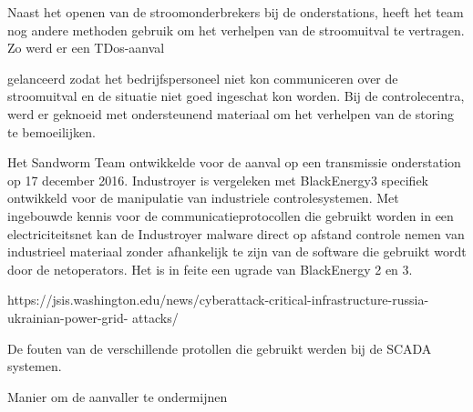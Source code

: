 {Naast het openen van de stroomonderbrekers bij de onderstations, heeft het team nog andere
methoden gebruik om het verhelpen van de stroomuitval te vertragen. Zo werd er een TDos-aanval

gelanceerd zodat het bedrijfspersoneel niet kon communiceren over de stroomuitval en de situatie
niet goed ingeschat kon worden. Bij de controlecentra, werd er geknoeid met ondersteunend
materiaal om het verhelpen van de storing te bemoeilijken.

Het Sandworm Team ontwikkelde voor de aanval op een transmissie onderstation op 17 december
2016. Industroyer is vergeleken met BlackEnergy3 specifiek ontwikkeld voor de manipulatie van
industriele controlesystemen. Met ingebouwde kennis voor de communicatieprotocollen die
gebruikt worden in een electriciteitsnet kan de Industroyer malware direct op afstand controle
nemen van industrieel materiaal zonder afhankelijk te zijn van de software die gebruikt wordt door
de netoperators. Het is in feite een ugrade van BlackEnergy 2 en 3.

https://jsis.washington.edu/news/cyberattack-critical-infrastructure-russia-ukrainian-power-grid-
attacks/

De fouten van de verschillende protollen die gebruikt werden bij de SCADA
systemen.



Manier om de aanvaller te ondermijnen


}
